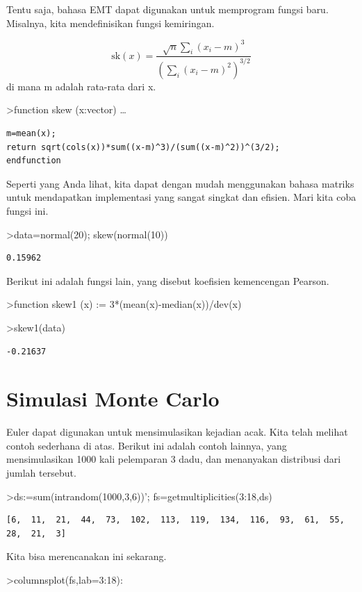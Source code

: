 \documentclass[
]{book}
\begin{document}
Tentu saja, bahasa EMT dapat digunakan untuk memprogram fungsi baru. Misalnya, kita mendefinisikan fungsi kemiringan.

\[\text{sk}(x) = \dfrac{\sqrt{n} \sum_i (x_i-m)^3}{\left(\sum_i (x_i-m)^2\right)^{3/2}}\]di mana m adalah rata-rata dari x.

\textgreater function skew (x:vector) \ldots{}

\begin{verbatim}
m=mean(x);
return sqrt(cols(x))*sum((x-m)^3)/(sum((x-m)^2))^(3/2);
endfunction
\end{verbatim}

Seperti yang Anda lihat, kita dapat dengan mudah menggunakan bahasa matriks untuk mendapatkan implementasi yang sangat singkat dan efisien. Mari kita coba fungsi ini.

\textgreater data=normal(20); skew(normal(10))

\begin{verbatim}
0.15962
\end{verbatim}

Berikut ini adalah fungsi lain, yang disebut koefisien kemencengan Pearson.

\textgreater function skew1 (x) := 3*(mean(x)-median(x))/dev(x)

\textgreater skew1(data)

\begin{verbatim}
-0.21637
\end{verbatim}

\chapter{Simulasi Monte Carlo}\label{simulasi-monte-carlo}

Euler dapat digunakan untuk mensimulasikan kejadian acak. Kita telah melihat contoh sederhana di atas. Berikut ini adalah contoh lainnya, yang mensimulasikan 1000 kali pelemparan 3 dadu, dan menanyakan distribusi dari jumlah tersebut.

\textgreater ds:=sum(intrandom(1000,3,6))'; fs=getmultiplicities(3:18,ds)

\begin{verbatim}
[6,  11,  21,  44,  73,  102,  113,  119,  134,  116,  93,  61,  55,
28,  21,  3]
\end{verbatim}

Kita bisa merencanakan ini sekarang.

\textgreater columnsplot(fs,lab=3:18):
\end{document}
